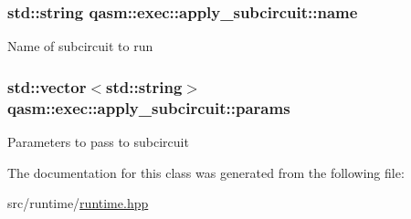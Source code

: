 \subsubsection[{\texorpdfstring{name}{name}}]{\setlength{\rightskip}{0pt plus 5cm}std\+::string qasm\+::exec\+::apply\+\_\+subcircuit\+::name}\hypertarget{classqasm_1_1exec_1_1apply__subcircuit_a6bf64c96ecf46285e9d18987a91b37fa}{}\label{classqasm_1_1exec_1_1apply__subcircuit_a6bf64c96ecf46285e9d18987a91b37fa}
Name of subcircuit to run 
\subsubsection[{\texorpdfstring{params}{params}}]{\setlength{\rightskip}{0pt plus 5cm}std\+::vector$<$std\+::string$>$ qasm\+::exec\+::apply\+\_\+subcircuit\+::params}\hypertarget{classqasm_1_1exec_1_1apply__subcircuit_ac7828e8ae990026dbcf6bb7b5cdc1d9b}{}\label{classqasm_1_1exec_1_1apply__subcircuit_ac7828e8ae990026dbcf6bb7b5cdc1d9b}
Parameters to pass to subcircuit 

The documentation for this class was generated from the following file\+:\begin{DoxyCompactItemize}
\item 
src/runtime/\hyperlink{runtime_8hpp}{runtime.\+hpp}\end{DoxyCompactItemize}
